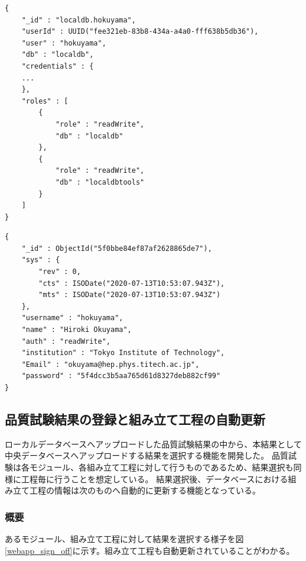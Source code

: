 \begin{lstlisting}[basicstyle=\scriptsize,caption=MongoDBアカウント情報を持つドキュメントの例。リスト中の"roles"より、localdbとlocaldbtoolsの読み書き権限が付加されていることが分かる。,label=user_doc_1]
{
	"_id" : "localdb.hokuyama",
	"userId" : UUID("fee321eb-83b8-434a-a4a0-fff638b5db36"),
	"user" : "hokuyama",
	"db" : "localdb",
	"credentials" : {
    ...
	},
	"roles" : [
		{
			"role" : "readWrite",
			"db" : "localdb"
		},
		{
			"role" : "readWrite",
			"db" : "localdbtools"
		}
	]
}
\end{lstlisting}
\begin{lstlisting}[basicstyle=\scriptsize,caption=ウェブアプリケーションで扱うユーザ情報を持つドキュメントの例。リスト\ref{user_doc_1}で示したものとは別に、ウェブアプリケーション内でユーザ情報を扱うためにこのドキュメントを保持する必要がある。ウェブにおいてログインはこのドキュメントの存在確認をもってなされる。パスワードはhash化して保存している。,label=user_doc_2]
{
	"_id" : ObjectId("5f0bbe84ef87af2628865de7"),
	"sys" : {
		"rev" : 0,
		"cts" : ISODate("2020-07-13T10:53:07.943Z"),
		"mts" : ISODate("2020-07-13T10:53:07.943Z")
	},
	"username" : "hokuyama",
	"name" : "Hiroki Okuyama",
	"auth" : "readWrite",
	"institution" : "Tokyo Institute of Technology",
	"Email" : "okuyama@hep.phys.titech.ac.jp",
	"password" : "5f4dcc3b5aa765d61d8327deb882cf99"
}
\end{lstlisting}

\clearpage
\newpage
\subsection{品質試験結果の登録と組み立て工程の自動更新}
ローカルデータベースへアップロードした品質試験結果の中から、本結果として中央データベースへアップロードする結果を選択する機能を開発した。
品質試験は各モジュール、各組み立て工程に対して行うものであるため、結果選択も同様に工程毎に行うことを想定している。
結果選択後、データベースにおける組み立て工程の情報は次のものへ自動的に更新する機能となっている。

\subsubsection{概要}
あるモジュール、組み立て工程に対して結果を選択する様子を図\ref{webapp_sign_off}に示す。組み立て工程も自動更新されていることがわかる。

